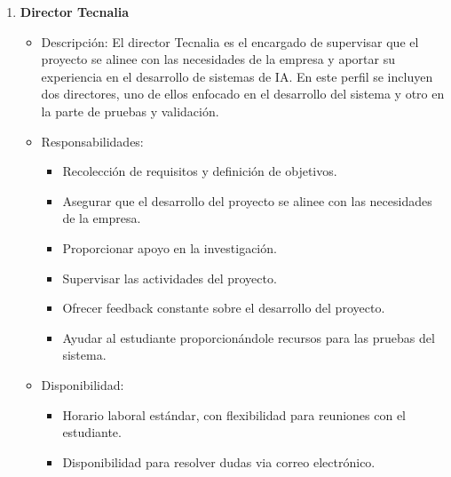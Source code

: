 \begin{enumerate}
    \item \textbf{Director Tecnalia}
    \begin{itemize}
        \item Descripción: El director Tecnalia es el encargado de supervisar que el 
        proyecto se alinee con las necesidades de la empresa y aportar su experiencia 
        en el desarrollo de sistemas de IA. En este perfil se incluyen dos directores,
        uno de ellos enfocado en el desarrollo del sistema y otro en la parte de pruebas
        y validación.
        \item Responsabilidades:
        \begin{itemize}
            \item Recolección de requisitos y definición de objetivos.
            \item Asegurar que el desarrollo del proyecto se alinee con las necesidades de la empresa.
            \item Proporcionar apoyo en la investigación.
            \item Supervisar las actividades del proyecto.
            \item Ofrecer feedback constante sobre el desarrollo del proyecto.
            \item Ayudar al estudiante proporcionándole recursos para las pruebas del sistema.
        \end{itemize}
        \item Disponibilidad:
        \begin{itemize}
            \item Horario laboral estándar, con flexibilidad para reuniones con el estudiante.
            \item Disponibilidad para resolver dudas via correo electrónico.
        \end{itemize}
    \end{itemize}


\end{enumerate}

